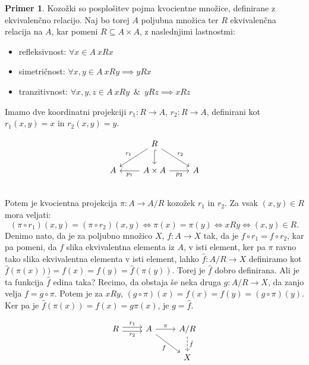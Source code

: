 \documentclass[12pt,a4paper]{book}
\theoremstyle{definition}
\theoremstyle{plain}
\theoremstyle{definition}
\newtheorem{primer}{Primer}[section]
\theoremstyle{remark}
\begin{document}
\begin{primer}
Kozožki so posplošitev pojma kvocientne množice, definirane z ekvivalenčno relacijo. Naj bo torej $A$ poljubna množica ter $R$ ekvivalenčna relacija na $A$, kar pomeni $R \subseteq A \times A$, z naslednjimi lastnostmi:
\begin{itemize}
\item refleksivnost: $\forall x \in A \ xRx$
\item simetričnost: $\forall x,y \in A \ xRy \implies yRx$
\item tranzitivnost: $\forall x,y,z \in A \ xRy \enspace\&\enspace yRz \implies xRz$
\end{itemize}
Imamo dve koordinatni projekciji $r_1 : R \to A$, $r_2 : R \to A$, definirani kot $r_1(x,y) = x$ in $r_2(x,y) = y$.

$$\begin{tikzcd}
& R \ar[dl, "r_1"'] \ar[d, hook] \ar[dr, "r_2"] & \\
A & A \times A \ar[l, "p_1"] \ar[r, "p_2"'] & A \\
\end{tikzcd}$$
Potem je kvocientna projekcija $\pi : A \to A/R$ kozožek $r_1$ in $r_2$.
Za vsak $(x,y) \in R$ mora veljati:
$$(\pi \circ r_1)(x,y) = (\pi \circ r_2)(x,y) \Leftrightarrow \pi(x) = \pi(y) \Leftrightarrow xRy \Leftrightarrow (x,y) \in R.$$ 
Denimo nato, da je za poljubno množico $X$, $f: A \to X$ tak, da je $f \circ r_1 = f \circ r_2$, kar pa pomeni, da $f$ slika ekvivalentna elementa iz $A$, v isti element, ker pa $\pi$  ravno tako slika ekvivalentna elementa v isti element, lahko $\hat{f}:A/R \to X$ definiramo kot $\hat{f}(\pi(x)) ) = f(x) = f(y) = \hat{f}(\pi(y))$. Torej je $\hat{f}$ dobro definirana. Ali je ta funkcija $\hat{f}$ edina taka? Recimo, da obstaja še neka druga $g : A/R \to X$, da zanjo velja $f = g \circ \pi$. Potem je za $xRy$, $(g \circ \pi)(x) = f(x) = f(y) = (g \circ\pi)(y)$. Ker pa je $\hat{f}(\pi(x)) = f(x) = g\pi(x)$, je $g = \hat{f}$.

$$\begin{tikzcd}
R \ar[r, shift left, "r_1"] \ar[r, shift right, "r_2"'] & A \ar[r, "\pi"] \ar[dr, "f"'] & A/R \ar[d, dashed, "\hat{f}"] \\
& & X \\
\end{tikzcd}$$

\end{primer}
\end{document}
